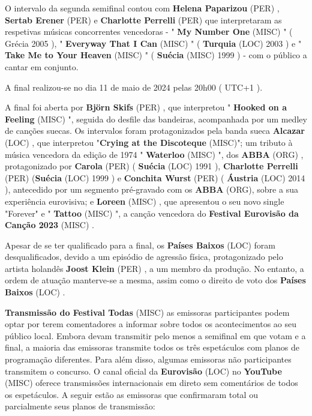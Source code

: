 \documentclass[12pt,a4paper]{article}
\begin{document}
O intervalo da segunda semifinal contou com \textbf{Helena Paparizou} (PER) , \textbf{Sertab Erener} (PER) e \textbf{Charlotte Perrelli} (PER) que interpretaram as respetivas músicas concorrentes vencedoras - " \textbf{My Number One} (MISC) " ( Grécia 2005 ), " \textbf{Everyway That I Can} (MISC) " ( \textbf{Turquia} (LOC) 2003 ) e " \textbf{Take Me to Your Heaven} (MISC) " ( \textbf{Suécia} (MISC) 1999 ) - com o público a cantar em conjunto.

A final realizou-se no dia 11 de maio de 2024 pelas 20h00 ( UTC+1 ).

A final foi aberta por \textbf{Björn Skifs} (PER) , que interpretou " \textbf{Hooked on a Feeling} (MISC) ", seguida do desfile das bandeiras, acompanhada por um medley de canções suecas. Os intervalos foram protagonizados pela banda sueca \textbf{Alcazar} (LOC) , que interpretou "\textbf{Crying at the Discoteque} (MISC)"; um tributo à música vencedora da edição de 1974 " \textbf{Waterloo} (MISC) ", dos \textbf{ABBA} (ORG) , protagonizado por \textbf{Carola} (PER) ( \textbf{Suécia} (LOC) 1991 ), \textbf{Charlotte Perrelli} (PER) (\textbf{Suécia} (LOC) 1999 ) e \textbf{Conchita Wurst} (PER) ( \textbf{Áustria} (LOC) 2014 ), antecedido por um segmento pré-gravado com os \textbf{ABBA} (ORG), sobre a sua experiência eurovisiva; e \textbf{Loreen} (MISC) , que apresentou o seu novo single "Forever" e " \textbf{Tattoo} (MISC) ", a canção vencedora do \textbf{Festival Eurovisão da Canção 2023} (MISC) .

Apesar de se ter qualificado para a final, os \textbf{Países Baixos} (LOC) foram desqualificados, devido a um episódio de agressão física, protagonizado pelo artista holandês \textbf{Joost Klein} (PER) , a um membro da produção. No entanto, a ordem de atuação manterve-se a mesma, assim como o direito de voto dos \textbf{Países Baixos} (LOC) .



\textbf{Transmissão do Festival Todas} (MISC) as emissoras participantes podem optar por terem comentadores a informar sobre todos os acontecimentos ao seu público local. Embora devam transmitir pelo menos a semifinal em que votam e a final, a maioria das emissoras transmite todos os três espetáculos com planos de programação diferentes. Para além disso, algumas emissoras não participantes transmitem o concurso. O canal oficial da \textbf{Eurovisão} (LOC) no \textbf{YouTube} (MISC) oferece transmissões internacionais em direto sem comentários de todos os espetáculos. A seguir estão as emissoras que confirmaram total ou parcialmente seus planos de transmissão:
\end{document}
